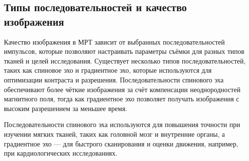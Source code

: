 \subsection{Типы последовательностей и качество изображения}

Качество изображения в МРТ зависит от выбранных последовательностей импульсов, которые позволяют настраивать параметры съёмки для разных типов тканей и целей исследования. Существует несколько типов последовательностей, таких как спиновое эхо и градиентное эхо, которые используются для оптимизации контраста и разрешения. Последовательности спинового эха обеспечивают более чёткие изображения за счёт компенсации неоднородностей магнитного поля, тогда как градиентное эхо позволяет получать изображения с высоким разрешением за меньшее время\cite{ktmrt}.

Последовательности спинового эха используются для повышения точности при изучении мягких тканей, таких как головной мозг и внутренние органы, а градиентное эхо — для быстрого сканирования и оценки движения, например, при кардиологических исследованиях\cite{ktmrt}.
